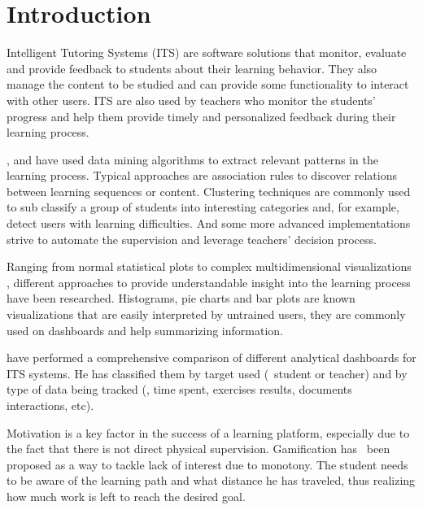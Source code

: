 \chapter{Introduction}\label{ch:introduction}


Intelligent Tutoring Systems (ITS) are software solutions that monitor, evaluate and provide feedback to students about their learning behavior. They also manage the content to be studied and can provide some functionality to interact with other users. ITS are also used by teachers who monitor the students’ progress and help them provide timely and personalized feedback during their learning process.

\citeauthor{Jugo2014} \cite{Jugo2014}, \citeauthor{Romero2008} \cite{Romero2008} and \citeauthor{Dogan2009} \cite{Dogan2009} have used data mining algorithms to extract relevant patterns in the learning process. Typical approaches are association rules to discover relations between learning sequences or content. Clustering techniques are commonly used to sub classify a group of students into interesting categories and, for example, detect users with learning difficulties. And some more advanced implementations strive to automate the supervision and leverage teachers' decision process.

Ranging from normal statistical plots \cite{Romero2008} to complex multidimensional visualizations \cite{Dogan2009}, different approaches to provide understandable insight into the learning process have been researched. Histograms, pie charts and bar plots are known visualizations that are easily interpreted by untrained users, they are commonly used on dashboards and help summarizing information.

\citeauthor{Verbert2013} \cite{Verbert2013} have performed a comprehensive comparison of different analytical dashboards for ITS systems. He has classified them by target used (\Ie\ student or teacher) and by type of data being tracked (\eg, time spent, exercises results, documents interactions, etc). 

Motivation is a key factor in the success of a learning platform, especially due to the fact that there is not direct physical supervision. Gamification \cite{Gonzalez2014} has \ been proposed as a way to tackle lack of interest due to monotony. The student needs to be aware of the learning path and what distance he has traveled, thus realizing how much work is left to reach the desired goal.


